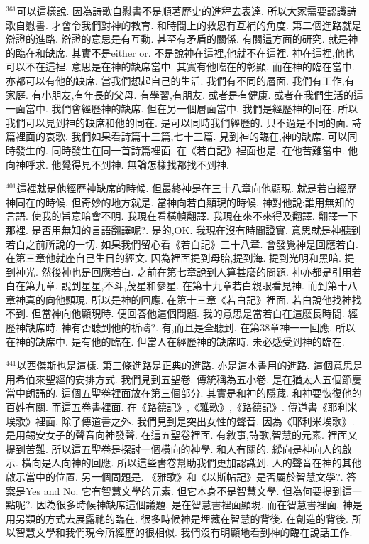\documentclass{book}
\begin{document}
$^{361}$可以這樣說.
因為詩歌自慰書不是順著歷史的進程去表達.
所以大家需要認識詩歌自慰書.
才會令我們對神的教育.
和時間上的救恩有互補的角度.
第二個進路就是辯證的進路.
辯證的意思是有互動.
甚至有矛盾的關係.
有關這方面的研究.
就是神的臨在和缺席.
其實不是either or.
不是說神在這裡,他就不在這裡.
神在這裡,他也可以不在這裡.
意思是在神的缺席當中.
其實有他臨在的彰顯.
而在神的臨在當中.
亦都可以有他的缺席.
當我們想起自己的生活.
我們有不同的層面.
我們有工作,有家庭.
有小朋友,有年長的父母.
有學習,有朋友.
或者是有健康.
或者在我們生活的這一面當中.
我們會經歷神的缺席.
但在另一個層面當中.
我們是經歷神的同在.
所以我們可以見到神的缺席和他的同在.
是可以同時我們經歷的.
只不過是不同的面.
詩篇裡面的哀歌.
我們如果看詩篇十三篇,七十三篇.
見到神的臨在,神的缺席.
可以同時發生的.
同時發生在同一首詩篇裡面.
在《若白記》裡面也是.
在他苦難當中.
他向神呼求.
他覺得見不到神.
無論怎樣找都找不到神.

$^{401}$這裡就是他經歷神缺席的時候.
但最終神是在三十八章向他顯現.
就是若白經歷神同在的時候.
但奇妙的地方就是.
當神向若白顯現的時候.
神對他說:誰用無知的言語.
使我的旨意暗會不明.
我現在看橫幀翻譯.
我現在來不來得及翻譯.
翻譯一下那裡.
是否用無知的言語翻譯呢?.
是的,OK.
我現在沒有時間證實.
意思就是神聽到若白之前所說的一切.
如果我們留心看《若白記》三十八章.
會發覺神是回應若白.
在第三章他就座自己生日的經文.
因為裡面提到母胎,提到海.
提到光明和黑暗.
提到神光.
然後神也是回應若白.
之前在第七章說到人算甚麼的問題.
神亦都是引用若白在第九章.
說到星星,不斗,茂星和參星.
在第十九章若白親眼看見神.
而到第十八章神真的向他顯現.
所以是神的回應.
在第十三章《若白記》裡面.
若白說他找神找不到.
但當神向他顯現時.
便回答他這個問題.
我的意思是當若白在這麼長時間.
經歷神缺席時.
神有否聽到他的祈禱?.
有,而且是全聽到.
在第38章神一一回應.
所以在神的缺席中.
是有他的臨在.
但當人在經歷神的缺席時.
未必感受到神的臨在.

$^{441}$以西傑斯也是這樣.
第三條進路是正典的進路.
亦是這本書用的進路.
這個意思是用希伯來聖經的安排方式.
我們見到五聖卷.
傳統稱為五小卷.
是在猶太人五個節慶當中朗誦的.
這個五聖卷裡面放在第三個部分.
其實是和神的隱藏.
和神要恢復他的百姓有關.
而這五卷書裡面.
在《路德記》,《雅歌》,《路德記》.
傳道書《耶利米埃歌》裡面.
除了傳道書之外.
我們見到是突出女性的聲音.
因為《耶利米埃歌》.
是用錫安女子的聲音向神發聲.
在這五聖卷裡面.
有敘事,詩歌,智慧的元素.
裡面又提到苦難.
所以這五聖卷是探討一個橫向的神學.
和人有關的.
縱向是神向人的啟示.
橫向是人向神的回應.
所以這些書卷幫助我們更加認識到.
人的聲音在神的其他啟示當中的位置.
另一個問題是.
《雅歌》和《以斯帖記》是否屬於智慧文學?.
答案是Yes and No.
它有智慧文學的元素.
但它本身不是智慧文學.
但為何要提到這一點呢?.
因為很多時候神缺席這個議題.
是在智慧書裡面顯現.
而在智慧書裡面.
神是用另類的方式去展露祂的臨在.
很多時候神是埋藏在智慧的背後.
在創造的背後.
所以智慧文學和我們現今所經歷的很相似.
我們沒有明顯地看到神的臨在說話工作.
\end{document}
